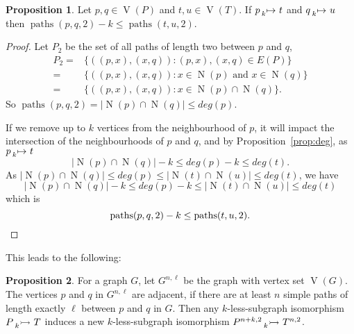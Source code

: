 \documentclass[letterpaper]{article}
\theoremstyle{definition}
\newtheorem{proposition}{Proposition}
\newcommand{\paths}{\operatorname{paths}}
\newcommand{\lessnonind}[1]{\prescript{}{#1}{\rightarrowtail}\ }
\newcommand{\lessmap}[1]{\prescript{}{#1}{\mapsto}\ }
\newcommand{\V}{\operatorname{V}}
\newcommand{\N}{\operatorname{N}}
\begin{document}
\begin{proposition}
    Let $p,q \in \V(P)$ and $t,u\in \V(T)$. If $p \lessmap{k} t$ and $q \lessmap{k} u$ then
     $\paths(p, q, 2) - k \le \paths(t, u, 2)$.
\end{proposition}
\begin{proof}
Let $P_{2}$ be the set of all paths of length two between $p$ and $q$,
\begin{align*}
P_{2} = & \{((p,x),(x,q)) : (p,x),(x,q)\in E(P) \} \\
 = & \{((p,x),(x,q)) : x\in \N(p) \text{ and } x\in \N(q) \} \\
 = & \{((p,x),(x,q)) : x\in \N(p)\cap \N(q) \} .
\end{align*}
So $\paths(p,q,2) = \left| \N(p)\cap \N(q) \right|  \leq deg(p)$.

If we remove up to $k$ vertices from the neighbourhood of $p$, it will impact the intersection of the neighbourhoods of $p$ and $q$, and by Proposition~\ref{prop:deg}, as $p\lessmap{k}t$
\[
\left| \N(p)\cap \N(q)\right| - k \leq deg(p) - k \leq deg(t).
\]
As $\left|\N(p)\cap \N(q)\right|\leq deg(p) \leq \left|\N(t)\cap \N(u)\right|\leq deg(t)$, we have
\[
\left|\N(p)\cap \N(q)\right| - k \leq deg(p) - k\leq \left|\N(t)\cap \N(u)\right|\leq deg(t)
\]
which is
\[
\paths(p, q, 2) - k \leq \paths(t, u, 2). \qedhere
\]
\end{proof}

This leads to the following:

\begin{proposition}
    For a graph $G$, let $G^{n, \ell}$ be the graph with vertex set $\V(G)$. The
    vertices $p$ and $q$ in $G^{n, \ell}$ are adjacent, if there are at least $n$ simple paths of
    length exactly $\ell$ between $p$ and $q$ in $G$. Then any $k$-less-subgraph isomorphism
    $P \lessnonind{k} T$ induces a new $k$-less-subgraph isomorphism
    $P^{n+k, 2}\lessnonind{k} T^{n, 2}$.
\end{proposition}
\end{document}
